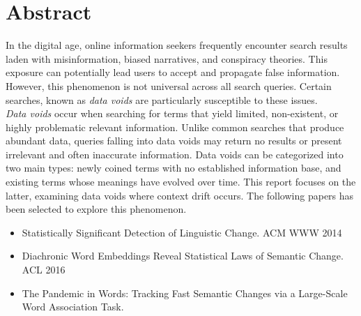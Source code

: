 
\section{Abstract} \label{sec:abstract}
    In the digital age, online information seekers frequently encounter search results laden with misinformation, biased narratives, and conspiracy theories.
    This exposure can potentially lead users to accept and propagate false information.
    However, this phenomenon is not universal across all search queries.
    Certain searches, known as \textit{data voids} are particularly susceptible to these issues.
    \\
    \textit{Data voids} occur when searching for terms that yield limited, non-existent, or highly problematic relevant information.
    Unlike common searches that produce abundant data, queries falling into data voids may return no results or present irrelevant and often inaccurate information.
    Data voids can be categorized into two main types: newly coined terms with no established information base, and existing terms whose meanings have evolved over time.
    This report focuses on the latter, examining data voids where context drift occurs.
    The following papers has been selected to explore this phenomenon.
    \begin{itemize}
        \item Statistically Significant Detection of Linguistic Change. ACM WWW 2014 \cite{kulkarni2014statisticallysignificantdetectionlinguistic}
        \item Diachronic Word Embeddings Reveal Statistical Laws of Semantic Change. ACL 2016 \cite{hamilton-etal-2016-diachronic}
        \item The Pandemic in Words: Tracking Fast Semantic Changes via a Large-Scale Word Association Task. \cite{10.1162/opmi_a_00081}
    \end{itemize}